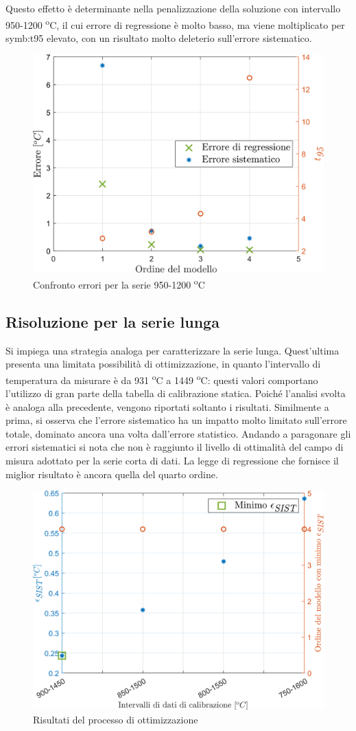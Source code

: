 Questo effetto è determinante nella penalizzazione della soluzione con intervallo 950-1200 \textsuperscript{o}C, il cui errore di regressione è molto basso, ma viene moltiplicato per \gls{symb:t95} elevato, con un risultato molto deleterio sull'errore sistematico. 

\begin{figure} [H]
	\centering
	\includegraphics[width=0.5\linewidth]{"../sperimentazione nei propulsori/err_sist_short_test"}
	\caption{Confronto errori per la serie 950-1200 \textsuperscript{o}C}
	\label{fig:errsistshorttest}
\end{figure}

\subsection{Risoluzione per la serie lunga}
Si impiega una strategia analoga per caratterizzare la serie lunga. Quest'ultima presenta una limitata possibilità di ottimizzazione, in quanto l'intervallo di temperatura da misurare è da 931 \textsuperscript{o}C a 1449 \textsuperscript{o}C: questi valori comportano l'utilizzo di gran parte della tabella di calibrazione statica. Poiché l'analisi svolta è analoga alla precedente, vengono riportati soltanto i risultati. Similmente a prima, si osserva che l'errore sistematico ha un impatto molto limitato sull'errore totale, dominato ancora una volta dall'errore statistico.
Andando a paragonare gli errori sistematici si nota che non è raggiunto il livello di ottimalità del campo di misura adottato per la serie corta di dati.  La legge di regressione che fornisce il miglior risultato è ancora quella del quarto ordine. 

\begin{figure} [H]
	\centering
	\includegraphics[width=0.6\linewidth]{"../sperimentazione nei propulsori/err_sist_long"}
	\caption{Risultati del processo di ottimizzazione}
	\label{fig:errsistlong}
\end{figure}

